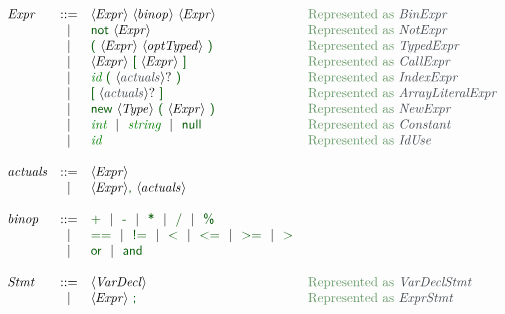 \begin{figure}
\[\begin{array}[t]{lcl@{\hspace{0.4cm}}l}
    \\
    \nta{Expr} & \Prod & \nt{Expr}\ \nt{binop}\ \nt{Expr} & \astmap{Represented as \ntaX{BinExpr}}\\
               & \VB   & \vterminal{not}\ \nt{Expr} & \astmap{Represented as \ntaX{NotExpr}}\\
               & \VB   & \vterminal{(}\ \nt{Expr}\ \nt{optTyped}\ \vterminal{)} & \astmap{Represented as \ntaX{TypedExpr}}\\
               & \VB   & \nt{Expr}\ \vterminal{[}\ \nt{Expr}\ \vterminal{]} & \astmap{Represented as \ntaX{CallExpr}}\\
               & \VB   & \terminal{id}\ \vterminal{(}\ \ntq{actuals}\ \vterminal{)} & \astmap{Represented as \ntaX{IndexExpr}}\\
               & \VB   & \vterminal{[}\ \ntq{actuals}\ \vterminal{]} & \astmap{Represented as \ntaX{ArrayLiteralExpr}}\\
               & \VB   & \vterminal{new}\ \nt{Type}\ \vterminal{(}\ \nt{Expr}\ \vterminal{)} & \astmap{Represented as \ntaX{NewExpr}}\\
               & \VB   & \terminal{int}\ \VB\ \terminal{string}\ \VB\ \vterminal{null} & \astmap{Represented as \ntaX{Constant}}\\
               & \VB   & \terminal{id} & \astmap{Represented as \ntaX{IdUse}}\\
    \\
    \nta{actuals} & \Prod & \nt{Expr} \\
                  & \VB   & \nt{Expr} \vterminal{,}\ \nt{actuals} \\
    \\
    \nta{binop} & \Prod &
		\vterminal{+}
                \ \VB\ \vterminal{-}
                \ \VB\ \vterminal{*}
                \ \VB\ \vterminal{/}
                \ \VB\ \vterminal{\%}\\
                & \VB& \vterminal{==}
                \ \VB\ \vterminal{!=}
                \ \VB\ \vterminal{$<$}
                \ \VB\ \vterminal{$<=$}
                \ \VB\ \vterminal{$>=$}
                \ \VB\ \vterminal{$>$}
                \\
                & \VB& \vterminal{or}
                \ \VB\ \vterminal{and}\\
    \\
    \nta{Stmt} & \Prod & \nt{VarDecl}  & \astmap{Represented as } \ntaX{VarDeclStmt}\\
               & \VB   & \nt{Expr}\ \vterminal{;} & \astmap{Represented as } \ntaX{ExprStmt}\\

\end{array}\]
\end{figure}
